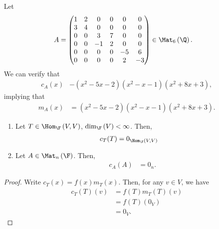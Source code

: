 \documentclass[10pt]{mypackage}
\begin{document}
\begin{example}
  Let
  \begin{align*}
    A &= \begin{pmatrix}1 & 2 & 0 & 0 & 0 & 0 \\ 3 & 4 & 0 & 0 & 0 & 0 \\ 0 & 0 & 3 & 7 & 0 & 0 \\ 0 & 0 & -1 & 2 & 0 & 0 \\ 0 & 0 & 0 & 0 & -5 & 6 \\ 0 & 0 & 0 & 0 & 2 & -3\end{pmatrix}\in \Mat_{6}\left(\Q\right).
  \end{align*}
  We can verify that
  \begin{align*}
    c_A(x) &- \left(x^{2}-5x-2\right)\left(x^2 - x - 1\right)\left(x^2 + 8x + 3\right),
  \end{align*}
  implying that
  \begin{align*}
    m_{A}\left(x\right) &= \left(x^{2}-5x-2\right)\left(x^2 - x - 1\right)\left(x^2 + 8x + 3\right).
  \end{align*}
\end{example}
\begin{theorem}\hfill
  \begin{enumerate}[(1)]
    \item Let $T\in \Hom_{\F}\left(V,V\right)$, $\dim_{\F}\left(V\right) < \infty$. Then,
      \begin{align*}
        c_T(T) &= 0_{\Hom_{\F}\left(V,V\right)}
      \end{align*}
    \item Let $A\in \Mat_{n}\left(\F\right)$. Then,
      \begin{align*}
        c_A(A) &= 0_{n}.
      \end{align*}
  \end{enumerate}
\end{theorem}
\begin{proof}
  Write $c_T(x) = f(x)m_T(x)$. Then, for any $v\in V$, we have
  \begin{align*}
    c_T(T)(v) &= f(T)m_T(T)(v)\\
              &= f(T)\left(0_V\right)\\
              &= 0_V.
  \end{align*}
\end{proof}
\end{document}
